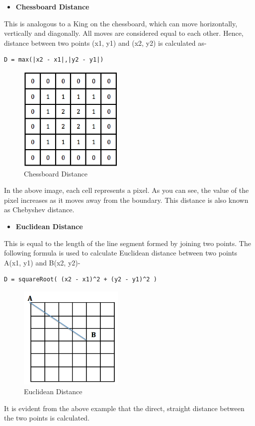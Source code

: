 \documentclass[]{article}
\providecommand{\tightlist}{%
  \setlength{\itemsep}{0pt}\setlength{\parskip}{0pt}}
\begin{document}
\begin{itemize}
\tightlist
\item
  \textbf{Chessboard Distance}
\end{itemize}

This is analogous to a King on the chessboard, which can move
horizontally, vertically and diagonally. All moves are considered equal
to each other. Hence, distance between two points (x1, y1) and (x2, y2)
is calculated as-

\begin{verbatim}
D = max(|x2 - x1|,|y2 - y1|)
\end{verbatim}
\pagebreak
\begin{figure}[htbp]
\centering
\includegraphics[width = 5cm]{images/Distance Transform/Chessboard Distance.png}
\caption{Chessboard Distance}
\end{figure}

In the above image, each cell represents a pixel. As you can see, the
value of the pixel increases as it moves away from the boundary. This
distance is also known as Chebyshev distance.

\begin{itemize}
\tightlist
\item
  \textbf{Euclidean Distance}
\end{itemize}

This is equal to the length of the line segment formed by joining two
points. The following formula is used to calculate Euclidean distance
between two points A(x1, y1) and B(x2, y2)-

\begin{verbatim}
D = squareRoot( (x2 - x1)^2 + (y2 - y1)^2 )
\end{verbatim}

\begin{figure}[htbp]
\centering
\includegraphics[width = 5cm]{images/Distance Transform/Euclidean Distance.png}
\caption{Euclidean Distance}
\end{figure}
\pagebreak
It is evident from the above example that the direct, straight distance
between the two points is calculated.
\end{document}
